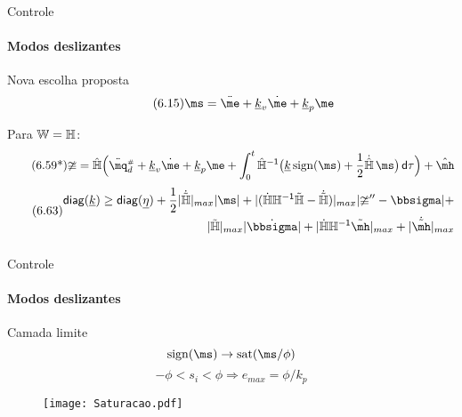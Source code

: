\documentclass[25pt,landscape]{beamer}
\begin{document}
\begin{frame}{Controle}
    \framesubtitle{Modos deslizantes}
    \begin{block}{Nova escolha proposta}
    	\begin{equation} \tag{6.15} 
			\ms = \ddot{\me} + \underline{k}_v \dot{\me} + \underline{k}_p \me
		\end{equation} 

		Para $\mathbb{W} = \mathbb{H}$:
		\begin{equation} \tag{6.59*}
			\mup = \hat{\mH} \Big(\ddot{\mq}\ssh_d + \underline{k}_v \dot{\me} + \underline{k}_p \me + \int_{0}^t \hat{\mH}^\msI \big( \underline{k} \sign(\ms) +  \frac{1}{2}\dot{\hat{\mH}} \, \ms \big) \, \dd \tau \Big) + \hat{\mh}
		\end{equation}
		\begin{equation} \label{eq:DesigualdadeK2_b2} \tag{6.63}
		\begin{split}
			\diag(\underline{k})  \geq \diag(\underline{\eta}) + \frac{1}{2}|\dot{\tilde{\mH}}|_{max} |\ms| + |( \dot{\mH} \mH^\msI \tilde{\mH} -\dot{\tilde{\mH}})|_{max} 	|\mup'' - \msigma |  + \\
			|\tilde{\mH}|_{max} |\dot{\msigma}| + |\dot{\mH} \mH^\msI \tilde{\mh}|_{max} + |\dot{\tilde{\mh}}|_{max}
		\end{split}			
		\end{equation}
		$$ $$
    \end{block}
\end{frame}

\begin{frame}{Controle}
    \framesubtitle{Modos deslizantes}
    \begin{block}{Camada limite}
    	\begin{equation*}
    		\sign(\ms) \rightarrow \sat(\ms/\phi)
    	\end{equation*}
    	\begin{equation*}
    		-\phi < s_i < \phi \Rightarrow e_{max} = \phi/k_p
    	\end{equation*}
    \end{block}
    \begin{figure}[!h]
        \centering
        \texttt{[image: Saturacao.pdf]}
    \end{figure}  
\end{frame}
\end{document}
